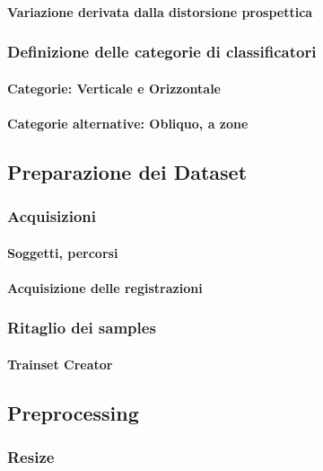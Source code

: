                 \paragraph{Variazione derivata dalla distorsione prospettica}
            \subsubsection{Definizione delle categorie di classificatori}
                \paragraph{Categorie: Verticale e Orizzontale}
                \paragraph{Categorie alternative: Obliquo, a zone}
        \subsection{Preparazione dei Dataset}
        \label{sub:datasets_setup}
            \subsubsection{Acquisizioni}
                \paragraph{Soggetti, percorsi}
                \paragraph{Acquisizione delle registrazioni}
            \subsubsection{Ritaglio dei samples}
                \paragraph{Trainset Creator}
        \subsection{Preprocessing}
        \label{sub:preprocessing}
            \subsubsection{Resize}
